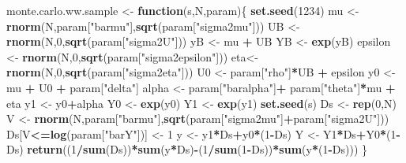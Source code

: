 \documentclass[]{book}
\newenvironment{Shaded}{\begin{snugshade}}{\end{snugshade}}
\newcommand{\ControlFlowTok}[1]{\textcolor[rgb]{0.13,0.29,0.53}{\textbf{#1}}}
\newcommand{\DecValTok}[1]{\textcolor[rgb]{0.00,0.00,0.81}{#1}}
\newcommand{\KeywordTok}[1]{\textcolor[rgb]{0.13,0.29,0.53}{\textbf{#1}}}
\newcommand{\NormalTok}[1]{#1}
\newcommand{\OperatorTok}[1]{\textcolor[rgb]{0.81,0.36,0.00}{\textbf{#1}}}
\newcommand{\StringTok}[1]{\textcolor[rgb]{0.31,0.60,0.02}{#1}}
\theoremstyle{definition}
\theoremstyle{definition}
\theoremstyle{definition}
\theoremstyle{remark}
\begin{document}
\begin{Shaded}
\begin{Highlighting}[]
\NormalTok{monte.carlo.ww.sample <-}\StringTok{ }\ControlFlowTok{function}\NormalTok{(s,N,param)\{}
  \KeywordTok{set.seed}\NormalTok{(}\DecValTok{1234}\NormalTok{)}
\NormalTok{  mu <-}\StringTok{ }\KeywordTok{rnorm}\NormalTok{(N,param[}\StringTok{"barmu"}\NormalTok{],}\KeywordTok{sqrt}\NormalTok{(param[}\StringTok{"sigma2mu"}\NormalTok{]))}
\NormalTok{  UB <-}\StringTok{ }\KeywordTok{rnorm}\NormalTok{(N,}\DecValTok{0}\NormalTok{,}\KeywordTok{sqrt}\NormalTok{(param[}\StringTok{"sigma2U"}\NormalTok{]))}
\NormalTok{  yB <-}\StringTok{ }\NormalTok{mu }\OperatorTok{+}\StringTok{ }\NormalTok{UB }
\NormalTok{  YB <-}\StringTok{ }\KeywordTok{exp}\NormalTok{(yB)}
\NormalTok{  epsilon <-}\StringTok{ }\KeywordTok{rnorm}\NormalTok{(N,}\DecValTok{0}\NormalTok{,}\KeywordTok{sqrt}\NormalTok{(param[}\StringTok{"sigma2epsilon"}\NormalTok{]))}
\NormalTok{  eta<-}\StringTok{ }\KeywordTok{rnorm}\NormalTok{(N,}\DecValTok{0}\NormalTok{,}\KeywordTok{sqrt}\NormalTok{(param[}\StringTok{"sigma2eta"}\NormalTok{]))}
\NormalTok{  U0 <-}\StringTok{ }\NormalTok{param[}\StringTok{"rho"}\NormalTok{]}\OperatorTok{*}\NormalTok{UB }\OperatorTok{+}\StringTok{ }\NormalTok{epsilon}
\NormalTok{  y0 <-}\StringTok{ }\NormalTok{mu }\OperatorTok{+}\StringTok{  }\NormalTok{U0 }\OperatorTok{+}\StringTok{ }\NormalTok{param[}\StringTok{"delta"}\NormalTok{]}
\NormalTok{  alpha <-}\StringTok{ }\NormalTok{param[}\StringTok{"baralpha"}\NormalTok{]}\OperatorTok{+}\StringTok{  }\NormalTok{param[}\StringTok{"theta"}\NormalTok{]}\OperatorTok{*}\NormalTok{mu }\OperatorTok{+}\StringTok{ }\NormalTok{eta}
\NormalTok{  y1 <-}\StringTok{ }\NormalTok{y0}\OperatorTok{+}\NormalTok{alpha}
\NormalTok{  Y0 <-}\StringTok{ }\KeywordTok{exp}\NormalTok{(y0)}
\NormalTok{  Y1 <-}\StringTok{ }\KeywordTok{exp}\NormalTok{(y1)}
  \KeywordTok{set.seed}\NormalTok{(s)}
\NormalTok{  Ds <-}\StringTok{ }\KeywordTok{rep}\NormalTok{(}\DecValTok{0}\NormalTok{,N)}
\NormalTok{  V <-}\StringTok{ }\KeywordTok{rnorm}\NormalTok{(N,param[}\StringTok{"barmu"}\NormalTok{],}\KeywordTok{sqrt}\NormalTok{(param[}\StringTok{"sigma2mu"}\NormalTok{]}\OperatorTok{+}\NormalTok{param[}\StringTok{"sigma2U"}\NormalTok{]))}
\NormalTok{  Ds[V}\OperatorTok{<=}\KeywordTok{log}\NormalTok{(param[}\StringTok{"barY"}\NormalTok{])] <-}\StringTok{ }\DecValTok{1} 
\NormalTok{  y <-}\StringTok{ }\NormalTok{y1}\OperatorTok{*}\NormalTok{Ds}\OperatorTok{+}\NormalTok{y0}\OperatorTok{*}\NormalTok{(}\DecValTok{1}\OperatorTok{-}\NormalTok{Ds)}
\NormalTok{  Y <-}\StringTok{ }\NormalTok{Y1}\OperatorTok{*}\NormalTok{Ds}\OperatorTok{+}\NormalTok{Y0}\OperatorTok{*}\NormalTok{(}\DecValTok{1}\OperatorTok{-}\NormalTok{Ds)}
  \KeywordTok{return}\NormalTok{((}\DecValTok{1}\OperatorTok{/}\KeywordTok{sum}\NormalTok{(Ds))}\OperatorTok{*}\KeywordTok{sum}\NormalTok{(y}\OperatorTok{*}\NormalTok{Ds)}\OperatorTok{-}\NormalTok{(}\DecValTok{1}\OperatorTok{/}\KeywordTok{sum}\NormalTok{(}\DecValTok{1}\OperatorTok{-}\NormalTok{Ds))}\OperatorTok{*}\KeywordTok{sum}\NormalTok{(y}\OperatorTok{*}\NormalTok{(}\DecValTok{1}\OperatorTok{-}\NormalTok{Ds)))}
\NormalTok{\}}


\end{Highlighting}
\end{Shaded}
\end{document}
